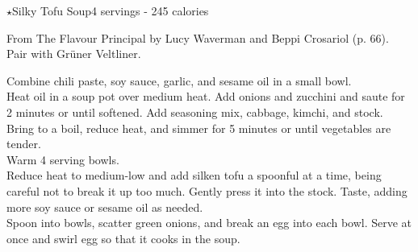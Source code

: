\begin{recipe}{\texorpdfstring{$\star$}{str}Silky Tofu Soup}{4 servings - 245 calories}{}

\freeform From {\normalfont The Flavour Principal} by Lucy Waverman and Beppi Crosariol (p. 66). Pair with Grüner Veltliner.


Combine chili paste, soy sauce, garlic, and sesame oil in a small bowl.\\

Heat oil in a soup pot over medium heat. Add onions and zucchini and saute for 2 minutes or until softened. Add seasoning mix, cabbage, kimchi, and stock. Bring to a boil, reduce heat, and simmer for 5 minutes or until vegetables are tender.\\

Warm 4 serving bowls.\\

Reduce heat to medium-low and add silken tofu a spoonful at a time, being careful not to break it up too much. Gently press it into the stock. Taste, adding more soy sauce or sesame oil as needed.\\

Spoon into bowls, scatter green onions, and break an egg into each bowl. Serve at once and swirl egg so that it cooks in the soup.

\end{recipe}